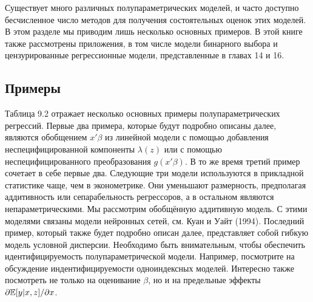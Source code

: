 Существует много различных полупараметрических моделей, и часто доступно бесчисленное число методов для получения состоятельных оценок этих моделей. В этом разделе мы приводим лишь несколько основных примеров. В этой книге также рассмотрены приложения, в том числе модели бинарного выбора и цензурированные регрессионные модели, представленные в главах 14 и 16.

\subsection{Примеры}

Таблица 9.2 отражает несколько основных примеры полупараметрических регрессий. Первые два примера, которые будут подробно описаны далее, являются обобщением $x'\beta$ из линейной модели с помощью добавления неспецифицированной компоненты $\lambda(z)$ или с помощью неспецифицированного преобразования $g(x'\beta)$. В то же время третий пример сочетает в себе первые два. Следующие три модели  используются в прикладной статистике чаще, чем в эконометрике. Они уменьшают размерность, предполагая аддитивность или сепарабельность регрессоров, а в остальном являются непараметрическими. Мы рассмотрим обобщённую аддитивную модель. С этими моделями связаны модели нейронных сетей, см. Куан и Уайт (1994). Последний пример, который также будет подробно описан далее, представляет собой гибкую модель условной дисперсии. Необходимо быть внимательным, чтобы обеспечить идентифицируемость полупараметрической модели. Например, посмотрите на обсуждение индентифицируемости одноиндексных моделей. Интересно также посмотреть не только на оценивание $\beta$, но и на предельные эффекты $\partial{\mathbb{E}}[y|x,z]/\partial{x}$.

